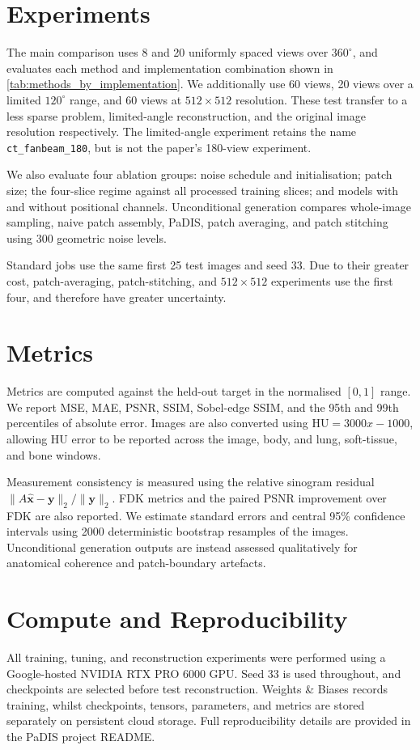 \section{Experiments}
The main comparison uses 8 and 20 uniformly spaced views over $360^\circ$, and evaluates each method and implementation combination shown in \autoref{tab:methods_by_implementation}. We additionally use 60 views, 20 views over a limited $120^\circ$ range, and 60 views at $512\times512$ resolution. These test transfer to a less sparse problem, limited-angle reconstruction, and the original image resolution respectively. The limited-angle experiment retains the name \texttt{ct\_fanbeam\_180}, but is not the paper's 180-view experiment.

We also evaluate four ablation groups: noise schedule and initialisation; patch size; the four-slice regime against all processed training slices; and models with and without positional channels. Unconditional generation compares whole-image sampling, naive patch assembly, PaDIS, patch averaging, and patch stitching using 300 geometric noise levels.

Standard jobs use the same first 25 test images and seed 33. Due to their greater cost, patch-averaging, patch-stitching, and $512\times512$ experiments use the first four, and therefore have greater uncertainty.

\section{Metrics}
Metrics are computed against the held-out target in the normalised $[0,1]$ range. We report MSE, MAE, PSNR, SSIM, Sobel-edge SSIM, and the 95th and 99th percentiles of absolute error. Images are also converted using $\mathrm{HU}=3000x-1000$, allowing HU error to be reported across the image, body, and lung, soft-tissue, and bone windows.

Measurement consistency is measured using the relative sinogram residual $\lVert A\hat{\mathbf{x}}-\mathbf{y}\rVert_2/\lVert\mathbf{y}\rVert_2$. FDK metrics and the paired PSNR improvement over FDK are also reported. We estimate standard errors and central 95\% confidence intervals using 2000 deterministic bootstrap resamples of the images. Unconditional generation outputs are instead assessed qualitatively for anatomical coherence and patch-boundary artefacts.

\section{Compute and Reproducibility}
All training, tuning, and reconstruction experiments were performed using a Google-hosted NVIDIA RTX PRO 6000 GPU. Seed 33 is used throughout, and checkpoints are selected before test reconstruction. Weights \& Biases records training, whilst checkpoints, tensors, parameters, and metrics are stored separately on persistent cloud storage. Full reproducibility details are provided in the PaDIS project README.

